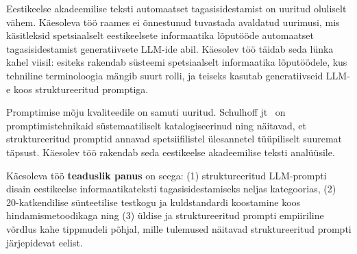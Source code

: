 Eestikeelse akadeemilise teksti automaatset tagasisidestamist on uuritud oluliselt vähem. Käesoleva töö raames ei õnnestunud tuvastada avaldatud uurimusi, mis käsitleksid spetsiaalselt eestikeelsete informaatika lõputööde automaatset tagasisidestamist generatiivsete LLM-ide abil. Käesolev töö täidab seda lünka kahel viisil: esiteks rakendab süsteemi spetsiaalselt informaatika lõputöödele, kus tehniline terminoloogia mängib suurt rolli, ja teiseks kasutab generatiivseid LLM-e koos struktureeritud promptiga.

Promptimise mõju kvaliteedile on samuti uuritud. Schulhoff jt~\cite{schulhoff_prompt_report_2024} on promptimistehnikaid süstemaatiliselt katalogiseerinud ning näitavad, et struktureeritud promptid annavad spetsiifilistel ülesannetel tüüpiliselt suuremat täpsust. Käesolev töö rakendab seda eestikeelse akadeemilise teksti analüüsile.

Käesoleva töö \textbf{teaduslik panus} on seega: (1) struktureeritud LLM-prompti disain eestikeelse informaatikateksti tagasisidestamiseks neljas kategoorias, (2) 20-katkendilise sünteetilise testkogu ja kuldstandardi koostamine koos hindamismetoodikaga ning (3) üldise ja struktureeritud prompti empiiriline võrdlus kahe tippmudeli põhjal, mille tulemused näitavad struktureeritud prompti järjepidevat eelist.
